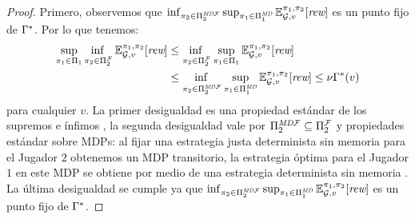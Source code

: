 \begin{proof}
  Primero, observemos que $\inf_{\pi_{2} \in \Pi^{\textit{MD}\mathcal{F}}_{2}}  \sup_{\pi_{1} \in \Pi^{\textit{MD}}_{1}} \mathbb{E}^{\pi_{1}, \pi_{2}}_{\mathcal{G},v}[\textit{rew}]$
  es un punto fijo de $\Gamma^*$.  Por lo que tenemos:
   \begin{align*}	
        \adjustlimits \sup_{\strat{1} \in \Strategies{1}}   \inf_{\strat{2} \in \FairStrats{2}}  \Expect{\strat{1}}{\strat{2}}_{\StochG,v}[\Rewards]
        & \leq \adjustlimits \inf_{\strat{2} \in \FairStrats{2}} \sup_{\strat{1} \in \Strategies{1}} \Expect{\strat{1}}{\strat{2}}_{\StochG,v}[\Rewards] \\
        &   \leq \adjustlimits  \inf_{\strat{2} \in \DetMemorylessFairStrats{2}}  \sup_{\strat{1} \in \DetMemorylessStrats{1}} \Expect{\strat{1}}{\strat{2}}_{\StochG,v}[\Rewards] 
         \leq   \nu \Bellman(v) 
  \end{align*} 
  para cualquier $v$. La primer desigualdad es una propiedad estándar de los supremos e ínfimos \cite{Kucera2011}, la segunda desigualdad vale por
  $\Pi^{\textit{MD}\mathcal{F}}_{2} \subseteq \Pi^{\mathcal{F}}_{2}$  y propiedades estándar sobre MDPs: al fijar una estrategia justa determinista sin memoria para el Jugador $2$ obtenemos un MDP transitorio, la estrategia óptima para el Jugador $1$ en este MDP se obtiene por medio de una estrategia determinista sin memoria \cite{Kallenberg83}. La última desigualdad se cumple ya que  $\inf_{\pi_{2} \in \Pi^{\textit{MD}\mathcal{F}}_{2}}  \sup_{\pi_{1} \in \Pi^{\textit{MD}}_{1}} \mathbb{E}^{\pi_{1}, \pi_{2}}_{\mathcal{G},v}[\textit{rew}]$ es 
  un punto fijo de $\Gamma^*$. 
  

\end{proof}
